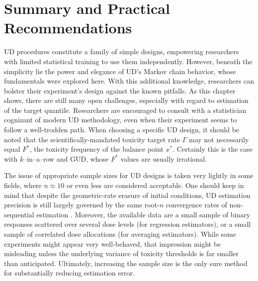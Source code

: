 \chapter{Summary and Practical Recommendations}\label{sec:summary}

UD procedures constitute a family of simple designs, empowering researchers with limited statistical training to use them independently. However, beneath the simplicity lie the power and elegance of UD's Markov chain behavior, whose fundamentals were explored here. With this additional knowledge, researchers can bolster their experiment's design against the known pitfalls. As this chapter shows, there are still many open challenges, especially with regard to estimation of the target quantile. Researchers are encouraged to consult with a statistician cognizant of modern UD methodology, even when their experiment seems to follow a well-trodden path. When choosing a specific UD design, it should be noted that the scientifically-mandated toxicity target rate $\Gamma$ may not necessarily equal $F^*$, the toxicity frequency of the balance point $x^*$. Certainly this is the case with $k$--in--a--row and GUD, whose $F^*$ values are usually irrational.

The issue of appropriate sample sizes for UD designs is taken very lightly in some fields, where $n\approx 10$ or even less are considered acceptable. One should keep in mind that despite the geometric-rate erasure of initial conditions, UD estimation precision is still largely governed by the same root-$n$ convergence rates of non-sequential estimation \citep[Section~1.2]{Oron07} . Moreover, the available data are a small sample of binary responses scattered over several dose levels (for regression estimators), or a small sample of correlated dose allocations (for averaging estimators). While some experiments might appear very well-behaved, that impression might be misleading unless the underlying variance of toxicity thresholds is far smaller than anticipated. Ultimately, increasing the sample size is the only sure method for substantially reducing estimation error.

